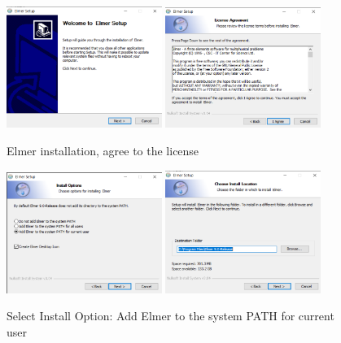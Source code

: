 \begin{figure}[H]
\begin{center}
\includegraphics[width=0.45\textwidth]{installer-3}
\includegraphics[width=0.45\textwidth]{installer-4}
\caption{Elmer installation, agree to the license}\label{fg:installer-3}
\end{center}
\end{figure}

\begin{figure}[H]
\begin{center}
\includegraphics[width=0.45\textwidth]{installer-5}
\includegraphics[width=0.45\textwidth]{installer-6}
\caption{Select Install Option: Add Elmer to the system PATH for current user}\label{fg:installer-5}
\end{center}
\end{figure}

